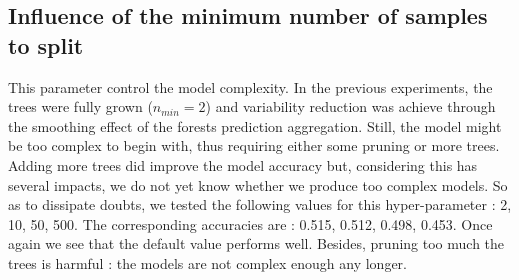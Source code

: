 \documentclass[a4paper]{report}
\begin{document}
		\subsection{Influence of the minimum number of samples to split}
		This parameter control the model complexity. In the previous experiments, the trees were fully grown ($n_{min} = 2$) and variability reduction was achieve through the smoothing effect of the forests prediction aggregation. Still, the model might be too complex to begin with, thus requiring either some pruning or more trees. Adding more trees did improve the model accuracy but, considering this has several impacts, we do not yet know whether we produce too complex models. So as to dissipate doubts, we tested the following values for this hyper-parameter : 2, 10, 50, 500. The corresponding accuracies are : 0.515, 0.512, 0.498, 0.453. Once again we see that the default value performs well. Besides, pruning too much the trees is harmful : the models are not complex enough any longer.
		
\end{document}
